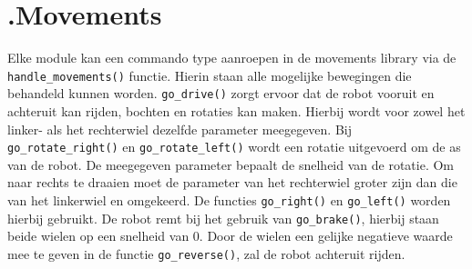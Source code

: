 \documentclass[a4paper,10pt]{article}
\begin{document}
\section*{\label{movements}\thesection.\quad Movements}
Elke module kan een commando type aanroepen in de movements library via de \verb!handle_movements()! functie. Hierin staan alle mogelijke bewegingen die behandeld kunnen worden.  
\verb!go_drive()! zorgt ervoor dat de robot vooruit en achteruit kan rijden, bochten en rotaties kan maken. Hierbij wordt voor zowel het linker- als het rechterwiel dezelfde parameter meegegeven. 
Bij \verb!go_rotate_right()! en \verb!go_rotate_left()! wordt een rotatie uitgevoerd om de as van de robot. De meegegeven parameter bepaalt de snelheid van de rotatie. 
Om naar rechts te draaien moet de parameter van het rechterwiel groter zijn dan die van het linkerwiel en omgekeerd. De functies \verb!go_right()! en \verb!go_left()! worden hierbij gebruikt.
De robot remt bij het gebruik van \verb!go_brake()!, hierbij staan beide wielen op een snelheid van 0.
Door de wielen een gelijke negatieve waarde mee te geven in de functie \verb!go_reverse()!, zal de robot achteruit rijden.

%
\end{document}
